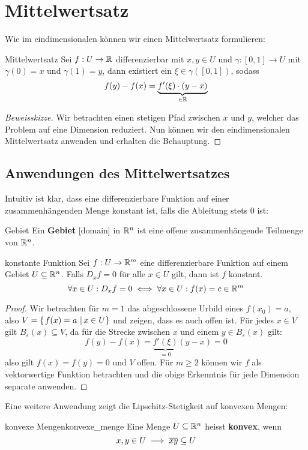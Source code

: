 \section{Mittelwertsatz}
Wie im eindimensionalen können wir einen Mittelwertsatz formulieren:
\begin{satz}{Mittelwertsatz}{}
Sei $f: U \to \mathbb{R}$ differenzierbar mit $x, y \in U$ und $\gamma: [0,1] \to U$ mit $\gamma(0)=x$ und $\gamma(1)=y$, dann existiert ein $\xi \in \gamma([0,1])$, sodass
$$f(y) - f(x) = \underbrace{f'(\xi)\cdot(y-x)}_{\in \mathbb{R}}$$
\end{satz}
\begin{proof}[Beweisskizze] Wir betrachten einen stetigen Pfad zwischen $x$ und $y$, welcher das Problem auf eine Dimension reduziert. Nun können wir den eindimensionalen Mittelwertsatz anwenden und erhalten die Behauptung.

\end{proof}
\subsection{Anwendungen des Mittelwertsatzes}
Intuitiv ist klar, dass eine differenzierbare Funktion auf einer zusammenhängenden Menge konstant ist, falls die Ableitung stets $0$ ist:

\begin{definition}{Gebiet}{}
Ein \textbf{Gebiet} [domain] in $\mathbb{R}^n$ ist eine offene zusammenhängende Teilmenge von $\mathbb{R}^n$.
\end{definition}

\begin{satz}{konstante Funktion}{}
Sei $f: U \to \mathbb{R}^m$ eine differenzierbare Funktion auf einem Gebiet $U \subseteq \mathbb{R}^n$. Falls $D_xf=0$ für alle $x \in U$ gilt, dann ist $f$ konstant.
$$\forall x \in U: D_xf=0 \iff \forall x \in U: f(x) = c \in \mathbb{R}^m$$
\end{satz}
\begin{proof}
Wir betrachten für $m=1$ das abgeschlossene Urbild eines $f(x_0) = a$, also $V = \left\{\left.f(x) = a \ \right| x \in U \right\}$ und zeigen, dass es auch offen ist. Für jedes $x \in V$ gilt $B_\varepsilon(x) \subseteq V$, da für die Strecke zwischen $x$ und einem $y \in B_\varepsilon(x)$ gilt:
$$ f(y) - f(x) = \underbrace{f'(\xi)}_{=0}(y-x) = 0$$
also gilt $f(x) = f(y) = 0$ und $V$ offen. Für $m \geq 2$ können wir $f$ als vektorwertige Funktion betrachten und die obige Erkenntnis für jede Dimension separate anwenden.
\end{proof}

Eine weitere Anwendung zeigt die Lipschitz-Stetigkeit auf konvexen Mengen:
\begin{definition}{konvexe Mengen}{konvexe_menge}
Eine Menge $U \subseteq \mathbb{R}^n$ heisst \textbf{konvex}, wenn
$$x,y \in U \implies \overline{xy} \subseteq U$$
\end{definition}

